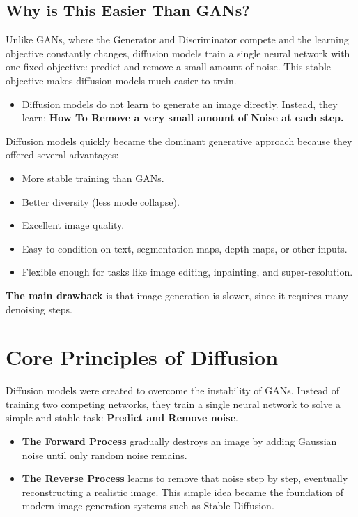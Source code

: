 \subsection*{Why is This Easier Than GANs?}

Unlike GANs, where the Generator and Discriminator compete and the learning objective constantly changes, diffusion models train a single neural network with one fixed objective: predict and remove a small amount of noise. This stable objective makes diffusion models much easier to train.

\begin{itemize}
    \item Diffusion models do not learn to generate an image directly. Instead, they learn: \textbf{How To Remove a very small amount of Noise at each step.}
\end{itemize}

Diffusion models quickly became the dominant generative approach because they offered several advantages:
\begin{itemize}
    \item More stable training than GANs.
    \item Better diversity (less mode collapse).
    \item Excellent image quality.
    \item Easy to condition on text, segmentation maps, depth maps, or other inputs.
    \item Flexible enough for tasks like image editing, inpainting, and super-resolution.
\end{itemize}

\textbf{The main drawback} is that image generation is slower, since it requires many denoising steps.

\section{Core Principles of Diffusion}

Diffusion models were created to overcome the instability of GANs. Instead of training two competing networks, they train a single neural network to solve a simple and stable task: \textbf{Predict and Remove noise}.
\begin{itemize}
    \item \textbf{The Forward Process} gradually destroys an image by adding Gaussian noise until only random noise remains.
    \item \textbf{The Reverse Process} learns to remove that noise step by step, eventually reconstructing a realistic image. This simple idea became the foundation of modern image generation systems such as Stable Diffusion.
\end{itemize}

